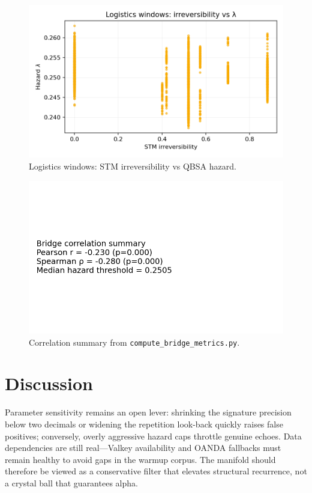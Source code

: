 \documentclass[11pt]{article}
\begin{document}
\begin{figure}[t]
  \centering
  \includegraphics[width=0.75\linewidth]{../figures/fig3_logistics_irreversibility_vs_lambda.png}
  \caption{Logistics windows: STM irreversibility vs QBSA hazard.}
  \label{fig:logistics-irr-lambda}
\end{figure}

\begin{figure}[t]
  \centering
  \includegraphics[width=0.5\linewidth]{../figures/fig4_bridge_correlation_summary.png}
  \caption{Correlation summary from \texttt{compute\_bridge\_metrics.py}.}
  \label{fig:bridge-summary}
\end{figure}

\section{Discussion}
Parameter sensitivity remains an open lever: shrinking the signature precision below two decimals or widening the repetition look-back quickly raises false positives; conversely, overly aggressive hazard caps throttle genuine echoes. Data dependencies are still real---Valkey availability and OANDA fallbacks must remain healthy to avoid gaps in the warmup corpus. The manifold should therefore be viewed as a conservative filter that elevates structural recurrence, not a crystal ball that guarantees alpha.
\end{document}
